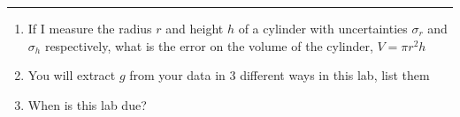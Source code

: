 \documentclass[11pt]{article}
\begin{document}
\Large

\medskip\hrule\bigskip\bigskip
{}
\begin{enumerate}

\item If I measure the radius $r$ and height $h$ of a cylinder with uncertainties $\sigma_r$ and $\sigma_h$ respectively, what is the error on the volume of the cylinder, $V=\pi r^2h$
  \vspace*{0.27\textheight}
\item You will extract $g$ from your data in 3 different ways in this lab, list them
  \vspace*{0.27\textheight}
\item When is this lab due?
  
\end{enumerate}
\end{document}
